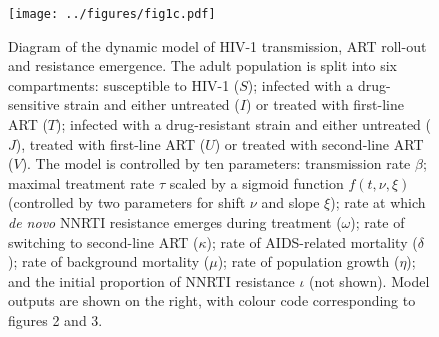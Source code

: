 \documentclass{article}
\begin{document}
\begin{figure}[t]
	\centering
	\texttt{[image: ../figures/fig1c.pdf]}
	
	\caption{Diagram of the dynamic model of HIV-1 transmission, ART roll-out and resistance emergence. The adult population is split into six compartments: susceptible to HIV-1 ($S$); infected with a drug-sensitive strain and either untreated ($I$) or treated with first-line ART ($T$); infected with a drug-resistant strain and either untreated ($J$), treated with first-line ART ($U$) or treated with second-line ART ($V$). The model is controlled by ten parameters: transmission rate $\beta$; maximal treatment rate $\tau$ scaled by a sigmoid function $f(t,\nu,\xi)$ (controlled by two parameters for shift $\nu$ and slope $\xi$); rate at which \emph{de novo} NNRTI resistance emerges during treatment ($\omega$); rate of switching to second-line ART ($\kappa$); rate of AIDS-related mortality ($\delta$); rate of background mortality ($\mu$); rate of population growth ($\eta$); and the initial proportion of NNRTI resistance $\iota$ (not shown). Model outputs are shown on the right, with colour code corresponding to figures 2 and 3.}
	\label{fig:odemodel}
\end{figure}
\end{document}
